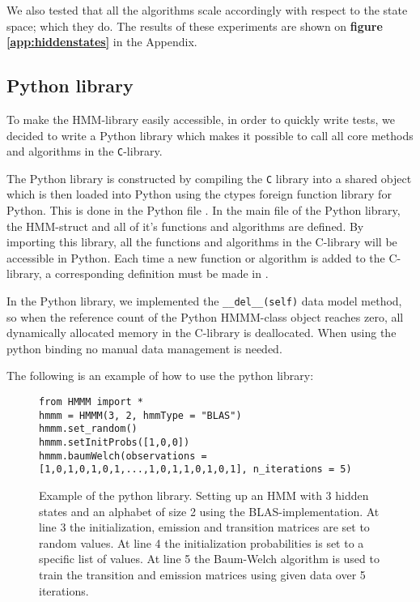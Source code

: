 We also tested that all the algorithms scale accordingly  with respect to the state space; which they do. The results of these experiments are shown on \textbf{figure \ref{app:hiddenstates}} in the Appendix.

\subsection{Python library}\label{sec:pb}
To make the HMM-library easily accessible, in order to quickly write tests, we decided to write a Python library which makes it possible to call all core methods and algorithms in the \texttt{C}-library.

The Python library is constructed by compiling the \texttt{C} library into a shared object which is then loaded into Python using the ctypes foreign function library\cite{ctypesman} for Python.
This is done in the Python file .
In the main file of the Python library, the HMM-struct and all of it's functions and algorithms are defined. By importing this library, all the functions and algorithms in the C-library will be accessible in Python.
Each time a new function or algorithm is added to the C-library, a corresponding definition must be made in .

In the Python library, we implemented the \texttt{\_\_del\_\_(self)} data model method\cite{pythonman}, so when the reference count of the Python HMMM-class object reaches zero, all dynamically allocated memory in the C-library is deallocated. When using the python binding no manual data management is needed.

The following is an example of how to use the python library:

\begin{figure}[H]
    \centering
\begin{lstlisting}[style=PYstyle]
from HMMM import *
hmmm = HMMM(3, 2, hmmType = "BLAS") 
hmmm.set_random()  
hmmm.setInitProbs([1,0,0])
hmmm.baumWelch(observations = [1,0,1,0,1,0,1,...,1,0,1,1,0,1,0,1], n_iterations = 5)\end{lstlisting}
\caption{\small{Example of the python library. Setting up an HMM with 3 hidden states and an alphabet of size 2 using the BLAS-implementation. At line 3 the initialization, emission and transition matrices are set to random values. At line 4 the initialization probabilities is set to a specific list of values.
At line 5 the Baum-Welch algorithm is used to train the transition and emission matrices using given data over 5 iterations.}}
\label{fig:pybind}
\end{figure}

